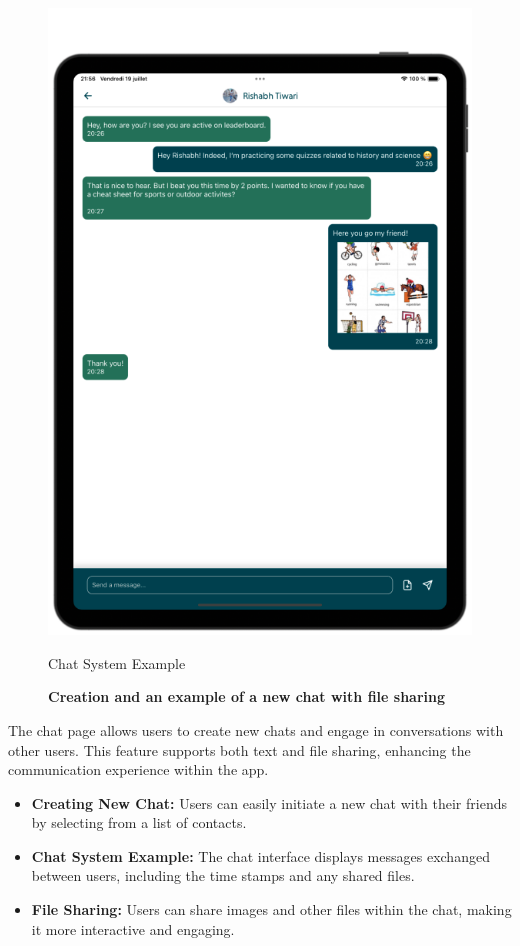\begin{figure}[H]
\begin{minipage}[b]{0.43\linewidth}
        \includegraphics[width=\linewidth]{TabletUI/Chat System Example.png}
        \caption{Chat System Example}
    \end{minipage}
    \vspace{0.5cm}
    \caption{\textbf{Creation and an example of a new chat with file sharing}}
\end{figure}

The chat page allows users to create new chats and engage in conversations with other users. This feature supports both text and file sharing, enhancing the communication experience within the app.

\begin{itemize}
    \item \textbf{Creating New Chat:} Users can easily initiate a new chat with their friends by selecting from a list of contacts.
    \item \textbf{Chat System Example:} The chat interface displays messages exchanged between users, including the time stamps and any shared files.
    \item \textbf{File Sharing:} Users can share images and other files within the chat, making it more interactive and engaging.
\end{itemize}

